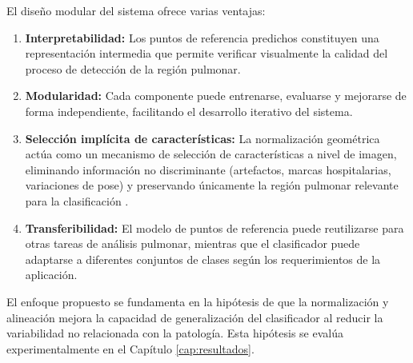 El diseño modular del sistema ofrece varias ventajas:

\begin{enumerate}
    \item \textbf{Interpretabilidad:} Los puntos de referencia predichos constituyen una representación intermedia que permite verificar visualmente la calidad del proceso de detección de la región pulmonar.

    \item \textbf{Modularidad:} Cada componente puede entrenarse, evaluarse y mejorarse de forma independiente, facilitando el desarrollo iterativo del sistema.

    \item \textbf{Selección implícita de características:} La normalización geométrica actúa como un mecanismo de selección de características a nivel de imagen, eliminando información no discriminante (artefactos, marcas hospitalarias, variaciones de pose) y preservando únicamente la región pulmonar relevante para la clasificación \cite{jaderberg2015spatial}.

    \item \textbf{Transferibilidad:} El modelo de puntos de referencia puede reutilizarse para otras tareas de análisis pulmonar, mientras que el clasificador puede adaptarse a diferentes conjuntos de clases según los requerimientos de la aplicación.
\end{enumerate}

El enfoque propuesto se fundamenta en la hipótesis de que la normalización y alineación mejora la capacidad de generalización del clasificador al reducir la variabilidad no relacionada con la patología. Esta hipótesis se evalúa experimentalmente en el Capítulo \ref{cap:resultados}.
